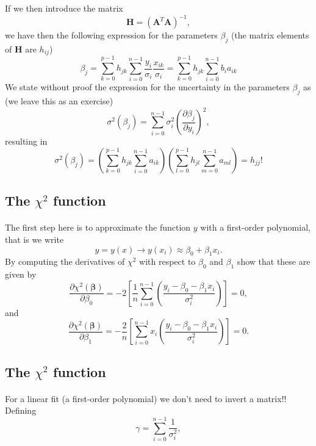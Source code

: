 \documentclass[%
oneside,                 %
final,                   %
10pt]{article}
\begin{document}
If we then introduce the matrix
\[
\bm{H} =  \left(\bm{A}^T\bm{A}\right)^{-1},
\]
we have then the following expression for the parameters $\beta_j$ (the matrix elements of $\bm{H}$ are $h_{ij}$)
\[
\beta_j = \sum_{k=0}^{p-1}h_{jk}\sum_{i=0}^{n-1}\frac{y_i}{\sigma_i}\frac{x_{ik}}{\sigma_i} = \sum_{k=0}^{p-1}h_{jk}\sum_{i=0}^{n-1}b_ia_{ik}
\]
We state without proof the expression for the uncertainty  in the parameters $\beta_j$ as (we leave this as an exercise)
\[
\sigma^2(\beta_j) = \sum_{i=0}^{n-1}\sigma_i^2\left( \frac{\partial \beta_j}{\partial y_i}\right)^2, 
\]
resulting in 
\[
\sigma^2(\beta_j) = \left(\sum_{k=0}^{p-1}h_{jk}\sum_{i=0}^{n-1}a_{ik}\right)\left(\sum_{l=0}^{p-1}h_{jl}\sum_{m=0}^{n-1}a_{ml}\right) = h_{jj}!
\]



\subsection{The $\chi^2$ function}

\paragraph{}
The first step here is to approximate the function $y$ with a first-order polynomial, that is we write
\[
y=y(x) \rightarrow y(x_i) \approx \beta_0+\beta_1 x_i.
\]
By computing the derivatives of $\chi^2$ with respect to $\beta_0$ and $\beta_1$ show that these are given by
\[
\frac{\partial \chi^2(\bm{\beta})}{\partial \beta_0} = -2\left[ \frac{1}{n}\sum_{i=0}^{n-1}\left(\frac{y_i-\beta_0-\beta_1x_{i}}{\sigma_i^2}\right)\right]=0,
\]
and
\[
\frac{\partial \chi^2(\bm{\beta})}{\partial \beta_1} = -\frac{2}{n}\left[ \sum_{i=0}^{n-1}x_i\left(\frac{y_i-\beta_0-\beta_1x_{i}}{\sigma_i^2}\right)\right]=0.
\]



\subsection{The $\chi^2$ function}

\paragraph{}

For a linear fit (a first-order polynomial) we don't need to invert a matrix!!  
Defining
\[
\gamma =  \sum_{i=0}^{n-1}\frac{1}{\sigma_i^2},
\]
\end{document}

